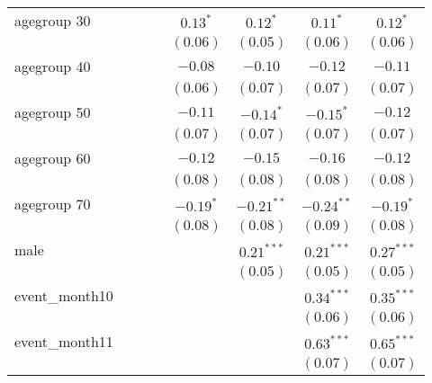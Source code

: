 \begin{table}
\begin{center}
\begin{tabular}{l c c c c c c c }
agegroup 30          &              &              &              & $0.13^{*}$   & $0.12^{*}$   & $0.11^{*}$   & $0.12^{*}$    \\
                     &              &              &              & $(0.06)$     & $(0.05)$     & $(0.06)$     & $(0.06)$      \\
agegroup 40          &              &              &              & $-0.08$      & $-0.10$      & $-0.12$      & $-0.11$       \\
                     &              &              &              & $(0.06)$     & $(0.07)$     & $(0.07)$     & $(0.07)$      \\
agegroup 50          &              &              &              & $-0.11$      & $-0.14^{*}$  & $-0.15^{*}$  & $-0.12$       \\
                     &              &              &              & $(0.07)$     & $(0.07)$     & $(0.07)$     & $(0.07)$      \\
agegroup 60          &              &              &              & $-0.12$      & $-0.15$      & $-0.16$      & $-0.12$       \\
                     &              &              &              & $(0.08)$     & $(0.08)$     & $(0.08)$     & $(0.08)$      \\
agegroup 70          &              &              &              & $-0.19^{*}$  & $-0.21^{**}$ & $-0.24^{**}$ & $-0.19^{*}$   \\
                     &              &              &              & $(0.08)$     & $(0.08)$     & $(0.09)$     & $(0.08)$      \\
male                 &              &              &              &              & $0.21^{***}$ & $0.21^{***}$ & $0.27^{***}$  \\
                     &              &              &              &              & $(0.05)$     & $(0.05)$     & $(0.05)$      \\
event\_month10       &              &              &              &              &              & $0.34^{***}$ & $0.35^{***}$  \\
                     &              &              &              &              &              & $(0.06)$     & $(0.06)$      \\
event\_month11       &              &              &              &              &              & $0.63^{***}$ & $0.65^{***}$  \\
                     &              &              &              &              &              & $(0.07)$     & $(0.07)$      \\

\end{tabular}
\end{center}
\end{table}
